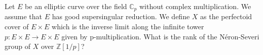 Let $E$ be an elliptic curve over the field $\mathbb{C}_p$ without complex multiplication. We assume that $E$ has good supersingular reduction. We define $X$ as the perfectoid cover of $E \times E$ which is the inverse limit along the infinite tower $p: E \times E \rightarrow E \times E$ given by p-multiplication. What is the rank of the N\'eron-Severi group of $X$ over $\mathbb{Z}[1/p]$?
